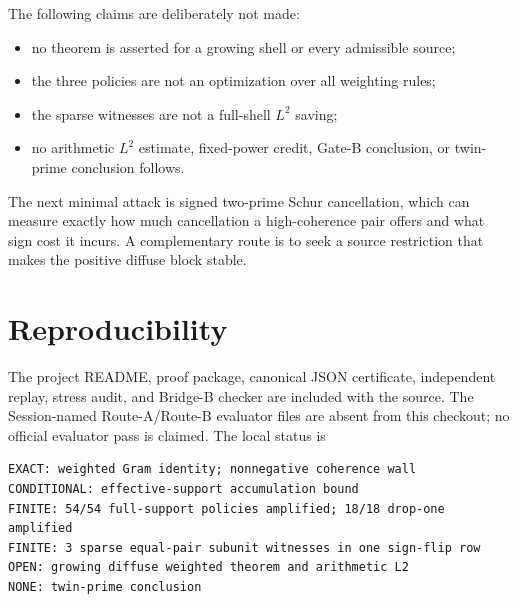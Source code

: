 \documentclass[10pt]{article}
\begin{document}
The following claims are deliberately not made:
\begin{itemize}
\item no theorem is asserted for a growing shell or every admissible source;
\item the three policies are not an optimization over all weighting rules;
\item the sparse witnesses are not a full-shell $L^2$ saving;
\item no arithmetic $L^2$ estimate, fixed-power credit, Gate-B conclusion, or
      twin-prime conclusion follows.
\end{itemize}

The next minimal attack is signed two-prime Schur cancellation, which can
measure exactly how much cancellation a high-coherence pair offers and what
sign cost it incurs.  A complementary route is to seek a source restriction
that makes the positive diffuse block stable.

\section{Reproducibility}

The project README, proof package, canonical JSON certificate, independent
replay, stress audit, and Bridge-B checker are included with the source.  The
Session-named Route-A/Route-B evaluator files are absent from this checkout;
no official evaluator pass is claimed.  The local status is

\begin{verbatim}
EXACT: weighted Gram identity; nonnegative coherence wall
CONDITIONAL: effective-support accumulation bound
FINITE: 54/54 full-support policies amplified; 18/18 drop-one amplified
FINITE: 3 sparse equal-pair subunit witnesses in one sign-flip row
OPEN: growing diffuse weighted theorem and arithmetic L2
NONE: twin-prime conclusion
\end{verbatim}



\end{document}
